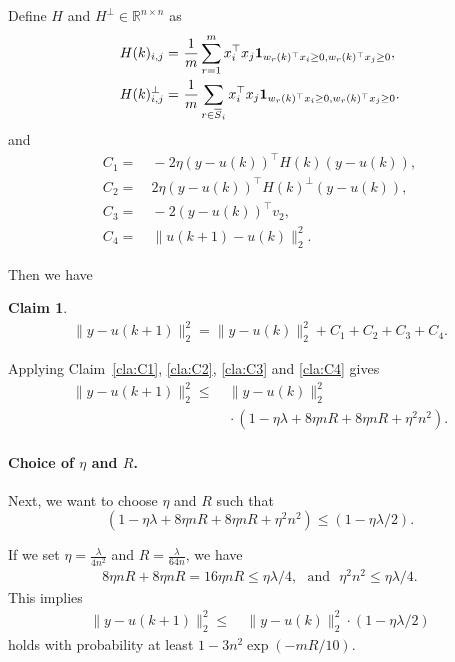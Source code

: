 \documentclass[11pt]{article}
\newcommand{\ov}{\overline}
\newcommand{\R}{\mathbb{R}}
\newtheorem{claim}[theorem]{Claim}
\begin{document}
Define $H$ and $H^{\bot} \in \R^{n \times n}$ as
\begin{align*}
H(k)_{i,j} = & ~ \frac{1}{m} \sum_{r=1}^m x_i^\top x_j {\bf 1}_{ w_r(k)^\top x_i \geq 0, w_r(k)^\top x_j \geq 0 } , \\
H(k)^{\bot}_{i,j} = & ~ \frac{1}{m} \sum_{r\in \ov{S}_i} x_i^\top x_j {\bf 1}_{ w_r(k)^\top x_i \geq 0, w_r(k)^\top x_j \geq 0 } .
\end{align*}
and
\begin{align*}
C_1 = & ~ -2 \eta (y - u(k))^\top H(k) ( y - u(k) ) , \\
C_2 = & ~ 2 \eta ( y - u(k) )^\top H(k)^{\bot} ( y - u(k) ) , \\
C_3 = & ~ - 2 ( y - u(k) )^\top v_2 , \\
C_4 = & ~ \| u (k+1) - u(k) \|_2^2 . 
\end{align*}

Then we have %
\begin{claim}\label{cla:inductive_claim}
\begin{align*}
\| y - u(k+1) \|_2^2 = \| y - u(k) \|_2^2 + C_1 + C_2 + C_3 + C_4.
\end{align*}
\end{claim}

Applying Claim~\ref{cla:C1}, \ref{cla:C2}, \ref{cla:C3} and \ref{cla:C4} gives
\begin{align*}
\| y - u(k+1) \|_2^2 
\leq & ~ \| y - u(k) \|_2^2 \\
 & ~ \cdot ( 1 - \eta \lambda + 8 \eta n R  + 8 \eta n R  + \eta^2 n^2 ).
\end{align*}

\paragraph{Choice of $\eta$ and $R$.}

Next, we want to choose $\eta$ and $R$ such that
\begin{equation}\label{eq:choice_of_eta_R}
( 1 - \eta \lambda + 8 \eta n R  + 8 \eta n R  + \eta^2 n^2 ) \leq (1-\eta\lambda/2) .
\end{equation}

If we set $\eta=\frac{\lambda }{4n^2}$ and $R=\frac{\lambda}{64n}$, we have 
\begin{align*}
8 \eta n R  + 8 \eta n R =16\eta nR \leq  \eta \lambda /4 ,
\mathrm{~~~and~~~} \eta^2 n^2 \leq  \eta \lambda / 4.
\end{align*}
This implies
\begin{align*}
\| y - u(k+1) \|_2^2 \leq & ~ \| y - u(k) \|_2^2 \cdot ( 1 - \eta \lambda / 2 )
\end{align*}
holds with probability at least $1-3n^2\exp(-mR/10)$.
\end{document}
